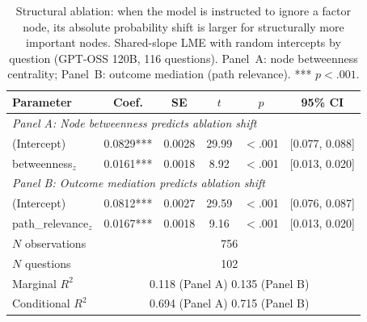 \begin{table}[htbp]
\centering
\small
\caption{Structural ablation: when the model is instructed to ignore a factor node, its absolute probability shift is larger for structurally more important nodes. Shared-slope LME with random intercepts by question (GPT-OSS 120B, 116 questions). Panel~A: node betweenness centrality; Panel~B: outcome mediation (path relevance). *** $p<.001$.}
\label{tab:lme_ablation}
\begin{tabular}{lccccc}
\toprule
Parameter & Coef. & SE & $t$ & $p$ & 95\% CI \\
\midrule
\multicolumn{6}{l}{\textit{Panel A: Node betweenness predicts ablation shift}} \\
(Intercept) & 0.0829*** & 0.0028 & 29.99 & $<$.001 & [0.077, 0.088] \\
betweenness$_z$ & 0.0161*** & 0.0018 & 8.92 & $<$.001 & [0.013, 0.020] \\
\midrule
\multicolumn{6}{l}{\textit{Panel B: Outcome mediation predicts ablation shift}} \\
(Intercept) & 0.0812*** & 0.0027 & 29.59 & $<$.001 & [0.076, 0.087] \\
path\_relevance$_z$ & 0.0167*** & 0.0018 & 9.16 & $<$.001 & [0.013, 0.020] \\
\midrule
$N$ observations     & \multicolumn{5}{c}{756} \\
$N$ questions        & \multicolumn{5}{c}{102} \\
Marginal $R^2$       & \multicolumn{5}{c}{0.118 (Panel A) \hspace{1em} 0.135 (Panel B)} \\
Conditional $R^2$    & \multicolumn{5}{c}{0.694 (Panel A) \hspace{1em} 0.715 (Panel B)} \\
\bottomrule
\end{tabular}
\end{table}

